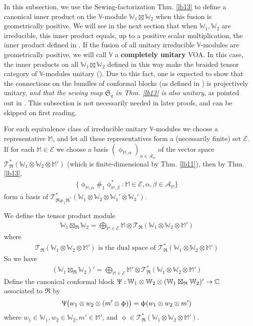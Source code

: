 \documentclass[11pt,b5paper,notitlepage]{article}
\theoremstyle{definition}
\theoremstyle{plain}
\newcommand{\fk}{\mathfrak}
\newcommand{\mc}{\mathcal}
\newcommand{\scr}{\mathscr}
\newcommand{\Vbb}{\mathbb V}
\newcommand{\Wbb}{\mathbb W}
\newcommand{\Mbb}{\mathbb M}
\newcommand{\Cbb}{\mathbb C}
\numberwithin{equation}{section}
\begin{document}
In this subsection, we use the Sewing-factorization Thm. \ref{lb13} to define a canonical inner product on the $\Vbb$-module $\Wbb_1\boxtimes\Wbb_2$ when this fusion is geometrically positive. We will see in the next section that when $\Wbb_1,\Wbb_2$ are irreducible, this inner product equals, up to a positive scalar multiplication, the inner product defined  in \cite{Gui19b}. If the fusion of all unitary irreducible $\Vbb$-modules are geometrically positive, we will call $\Vbb$ a \textbf{completely unitary} VOA. In this case, the inner products on all $\Wbb_1\boxtimes\Wbb_2$ defined in this way make the braided tensor category of $\Vbb$-modules unitary (\cite[Thm. 7.8]{Gui19b}). Due to this fact, one is expected to show that the  connections on the bundles of conformal blocks (as defined in \cite[Chapter 17]{FB04}) is projectively unitary, \emph{and that the sewing map $\fk S_q$ in Thm. \ref{lb13} is also unitary}, as pointed out in \cite[Thm. 10.10]{Kir98}. This subsection is not necessarily needed in later proofs, and can be skipped on first reading.


For each equivalence class of irreducible unitary $\Vbb$-modules we choose a representative $\Mbb$, and let all these representatives form a (necessarily finite) set $\mc E$. If for each $\Mbb\in\mc E$ we choose a basis $(\upphi_{\Mbb,\alpha})_{\alpha\in\mc A_\Mbb}$ of the vector space $\scr T_{\fk R}^*(\Wbb_1\otimes\Wbb_2\otimes\Mbb')$ (which is finite-dimensional by Thm. \ref{lb11}), then by Thm. \ref{lb13},
\begin{align}
\{\upphi_{\Mbb,\alpha}\#_1\upphi_{\Mbb,\beta}^*:\Mbb\in\mc E,\alpha,\beta\in\mc A_{\Mbb}\}  \label{eq60}
\end{align}
form a basis of $\scr T_{\fk R\#_1\fk R^*}^*(\Wbb_1\otimes\Wbb_2\otimes\Wbb_1'\otimes\Wbb_2')$.


We define the tensor product module
\begin{align}\label{eq66}
\Wbb_1\boxtimes_{\fk R}\Wbb_2=\bigoplus_{\Mbb\in\mc E}\Mbb\otimes\scr T_{\fk R}(\Wbb_1\otimes\Wbb_2\otimes\Mbb')
\end{align}
where
\begin{align*}
\scr T_{\fk R}(\Wbb_1\otimes\Wbb_2\otimes\Mbb')\text{ is the dual space of }\scr T_{\fk R}^*(\Wbb_1\otimes\Wbb_2\otimes\Mbb')
\end{align*}
So we have
\begin{align*}
(\Wbb_1\boxtimes_{\fk R}\Wbb_2)'=\bigoplus_{\Mbb\in\mc E}\Mbb'\otimes\scr T_{\fk R}^*(\Wbb_1\otimes\Wbb_2\otimes\Mbb')
\end{align*}
Define the canonical conformal block $\Uppsi:\Wbb_1\otimes\Wbb_2\otimes (\Wbb_1\boxtimes_{\fk R}\Wbb_2)'\rightarrow\Cbb$ associated to $\fk R$ by
\begin{align}
\Uppsi\big(w_1\otimes w_2\otimes (m'\otimes\upphi)\big)=\upphi(w_1\otimes w_2\otimes m') \label{eq65}
\end{align}
where $w_1\in\Wbb_1,w_2\in\Wbb_2,m'\in\Mbb'$, and $\upphi\in\scr T_{\fk R}^*(\Wbb_1\otimes\Wbb_2\otimes\Mbb')$. 
\end{document}
